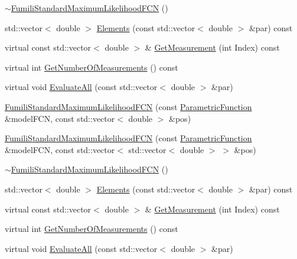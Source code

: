 \begin{DoxyCompactItemize}
\item 
\mbox{\hyperlink{classROOT_1_1Minuit2_1_1FumiliStandardMaximumLikelihoodFCN_aa43a2e65c5083814ee9a08ee51f6abd5}{$\sim$\+Fumili\+Standard\+Maximum\+Likelihood\+F\+CN}} ()
\item 
std\+::vector$<$ double $>$ \mbox{\hyperlink{classROOT_1_1Minuit2_1_1FumiliStandardMaximumLikelihoodFCN_af104474f9095c245b467f9db554a126a}{Elements}} (const std\+::vector$<$ double $>$ \&par) const
\item 
virtual const std\+::vector$<$ double $>$ \& \mbox{\hyperlink{classROOT_1_1Minuit2_1_1FumiliStandardMaximumLikelihoodFCN_a942bb66ec7d48d9ec0ea3d883dff7378}{Get\+Measurement}} (int Index) const
\item 
virtual int \mbox{\hyperlink{classROOT_1_1Minuit2_1_1FumiliStandardMaximumLikelihoodFCN_a7c1f879db750fb33c206d3edbbd19ae0}{Get\+Number\+Of\+Measurements}} () const
\item 
virtual void \mbox{\hyperlink{classROOT_1_1Minuit2_1_1FumiliStandardMaximumLikelihoodFCN_a37e72fc87092e5699066098fa5a31235}{Evaluate\+All}} (const std\+::vector$<$ double $>$ \&par)
\item 
\mbox{\hyperlink{classROOT_1_1Minuit2_1_1FumiliStandardMaximumLikelihoodFCN_af7dc80571b509a0a4f2f7ef821c3b1e6}{Fumili\+Standard\+Maximum\+Likelihood\+F\+CN}} (const \mbox{\hyperlink{classROOT_1_1Minuit2_1_1ParametricFunction}{Parametric\+Function}} \&model\+F\+CN, const std\+::vector$<$ double $>$ \&pos)
\item 
\mbox{\hyperlink{classROOT_1_1Minuit2_1_1FumiliStandardMaximumLikelihoodFCN_af233ad0d9ef029dd8aa6a145ea991483}{Fumili\+Standard\+Maximum\+Likelihood\+F\+CN}} (const \mbox{\hyperlink{classROOT_1_1Minuit2_1_1ParametricFunction}{Parametric\+Function}} \&model\+F\+CN, const std\+::vector$<$ std\+::vector$<$ double $>$ $>$ \&pos)
\item 
\mbox{\hyperlink{classROOT_1_1Minuit2_1_1FumiliStandardMaximumLikelihoodFCN_aa43a2e65c5083814ee9a08ee51f6abd5}{$\sim$\+Fumili\+Standard\+Maximum\+Likelihood\+F\+CN}} ()
\item 
std\+::vector$<$ double $>$ \mbox{\hyperlink{classROOT_1_1Minuit2_1_1FumiliStandardMaximumLikelihoodFCN_af104474f9095c245b467f9db554a126a}{Elements}} (const std\+::vector$<$ double $>$ \&par) const
\item 
virtual const std\+::vector$<$ double $>$ \& \mbox{\hyperlink{classROOT_1_1Minuit2_1_1FumiliStandardMaximumLikelihoodFCN_a942bb66ec7d48d9ec0ea3d883dff7378}{Get\+Measurement}} (int Index) const
\item 
virtual int \mbox{\hyperlink{classROOT_1_1Minuit2_1_1FumiliStandardMaximumLikelihoodFCN_a7c1f879db750fb33c206d3edbbd19ae0}{Get\+Number\+Of\+Measurements}} () const
\item 
virtual void \mbox{\hyperlink{classROOT_1_1Minuit2_1_1FumiliStandardMaximumLikelihoodFCN_a37e72fc87092e5699066098fa5a31235}{Evaluate\+All}} (const std\+::vector$<$ double $>$ \&par)
\end{DoxyCompactItemize}
